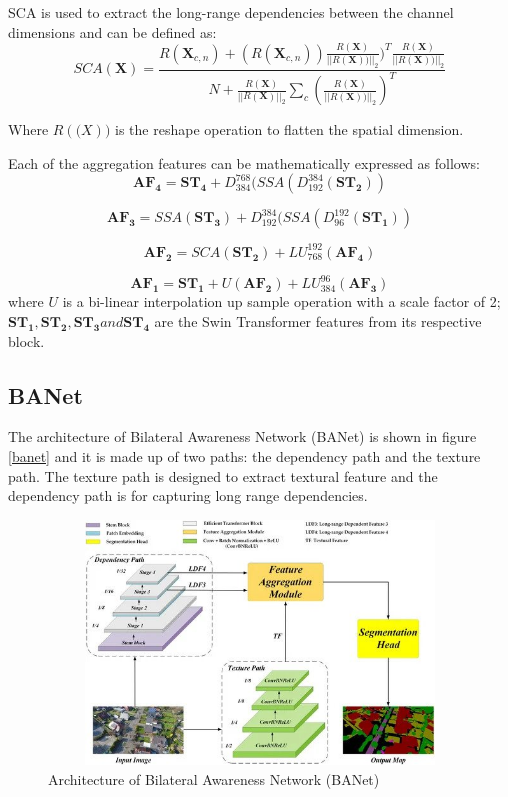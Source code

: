 SCA is used to extract the long-range dependencies between the channel dimensions and can be defined as:
\begin{equation}
    SCA(\mathbf{X}) = \frac{ R(\mathbf{X}_{c,n})+(R(\mathbf{X}_{c,n}))\frac{R(\mathbf{X})}{||R(\mathbf{X}))||_2})^T \frac{R(\mathbf{X})}{||R(\mathbf{X}))||_2} }
    {N + \frac{R(\mathbf{X})}{||R(\mathbf{X})||_2} \sum_c(\frac{R(\mathbf{X})}{||R(\mathbf{X}))||_2})^T }
\end{equation}

Where $R(\mathbf(X))$ is the reshape operation to flatten the spatial dimension.

Each of the aggregation features can be mathematically expressed as follows:
\begin{equation}
    \mathbf{AF_4} = \mathbf{ST_4} + D^{768}_{384} (SSA(D^{384}_{192}(\mathbf{ST_2}))
\end{equation}

\begin{equation}
    \mathbf{AF_3} = SSA(\mathbf{ST_3})+ D^{384}_{192} (SSA(D^{192}_{96}(\mathbf{ST_1}))
\end{equation}

\begin{equation}
    \mathbf{AF_2} = SCA(\mathbf{ST_2})+ LU^{192}_{768} (\mathbf{AF_4})
\end{equation}

\begin{equation}
    \mathbf{AF_1} = \mathbf{ST_1} + U(\mathbf{AF_2}) + LU^{96}_{384}(\mathbf{AF_3})
\end{equation}
where $U$ is a bi-linear interpolation up sample operation with a scale factor of 2; $\mathbf{ST_1}, \mathbf{ST_2}, \mathbf{ST_3} and \mathbf{ST_4}$ are the Swin Transformer features from its respective block.
\subsection{BANet}
The architecture of Bilateral Awareness Network (BANet) is shown in figure \ref{banet} and it is made up of two paths: the dependency path and the texture path. The texture path is designed to extract textural feature and the dependency path is for capturing long range dependencies.

\FloatBarrier
\begin{figure}[ht]
\includegraphics[width=12.5cm, height=6.5cm]{images/banet.jpg}
\centering
\caption{Architecture of Bilateral Awareness Network (BANet) \protect\cite{banet}}
\label{fig:banet}
\end{figure}

